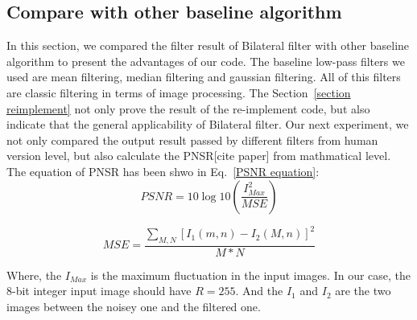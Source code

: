 \documentclass[12pt]{article}
\begin{document}
\subsection{Compare with other baseline algorithm}
\label{baseline comparison}
In this section, we compared the filter result of Bilateral filter with other baseline algorithm to present the advantages of our code.
The baseline low-pass filters we used are mean filtering, median filtering and gaussian filtering. 
All of this filters are classic filtering in terms of image processing.
The Section~\ref{section reimplement} not only prove the result of the re-implement code, but also indicate that the general applicability of Bilateral filter.
Our next experiment, we not only compared the output result passed by different filters from human version level, but also calculate the PNSR[cite paper] from mathmatical level. 
The equation of PNSR has been shwo in Eq.~\ref{PSNR equation}:
\begin{equation}
  PSNR = 10\log 10 (\frac{I_{Max}^{2}}{MSE})
  \label{PSNR equation}
\end{equation}

\begin{equation}
  MSE = \frac{\sum_{M, N}[I_1(m,n) - I_2(M, n)]^2}{M * N}
  \label{MSE}
\end{equation}

Where, the $I_{Max}$ is the maximum fluctuation in the input images. 
In our case, the 8-bit integer input image should have $R = 255$.
And the $I_1$ and $I_2$ are the two images between the noisey one and the filtered one.
  
\end{document}
